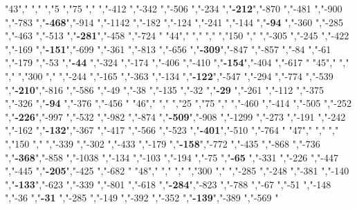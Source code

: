 "43","        ","     ","5   ","75  ","     ","-412          ","-342          ","-506          ","-234          ","\textbf{-212}","-870          ","-481          ","-900          ","-783          ","\textbf{-468}","-914          ","-1142         ","-182          ","-124          ","-241          ","-144          ","\textbf{-94} ","-360          ","-285          ","-463          ","-513          ","\textbf{-281}","-458          ","-724          "
"44","        ","     ","    ","150 ","     ","-305          ","-245          ","-422          ","-169          ","\textbf{-151}","-699          ","-361          ","-813          ","-656          ","\textbf{-309}","-847          ","-857          ","-84           ","-61           ","-179          ","-53           ","\textbf{-44} ","-324          ","-174          ","-406          ","-410          ","\textbf{-154}","-404          ","-617          "
"45","        ","     ","    ","300 ","     ","-244          ","-165          ","-363          ","-134          ","\textbf{-122}","-547          ","-294          ","-774          ","-539          ","\textbf{-210}","-816          ","-586          ","-49           ","-38           ","-135          ","-32           ","\textbf{-29} ","-261          ","-112          ","-375          ","-326          ","\textbf{-94} ","-376          ","-456          "
"46","        ","     ","25  ","75  ","     ","-460          ","-414          ","-505          ","-252          ","\textbf{-226}","-997          ","-532          ","-982          ","-874          ","\textbf{-509}","-908          ","-1299         ","-273          ","-191          ","-242          ","-162          ","\textbf{-132}","-367          ","-417          ","-566          ","-523          ","\textbf{-401}","-510          ","-764          "
"47","        ","     ","    ","150 ","     ","-339          ","-302          ","-433          ","-179          ","\textbf{-158}","-772          ","-435          ","-868          ","-736          ","\textbf{-368}","-858          ","-1038         ","-134          ","-103          ","-194          ","-75           ","\textbf{-65} ","-331          ","-226          ","-447          ","-445          ","\textbf{-205}","-425          ","-682          "
"48","        ","     ","    ","300 ","     ","-285          ","-248          ","-381          ","-140          ","\textbf{-133}","-623          ","-339          ","-801          ","-618          ","\textbf{-284}","-823          ","-788          ","-67           ","-51           ","-148          ","-36           ","\textbf{-31} ","-285          ","-149          ","-392          ","-352          ","\textbf{-139}","-389          ","-569          "

